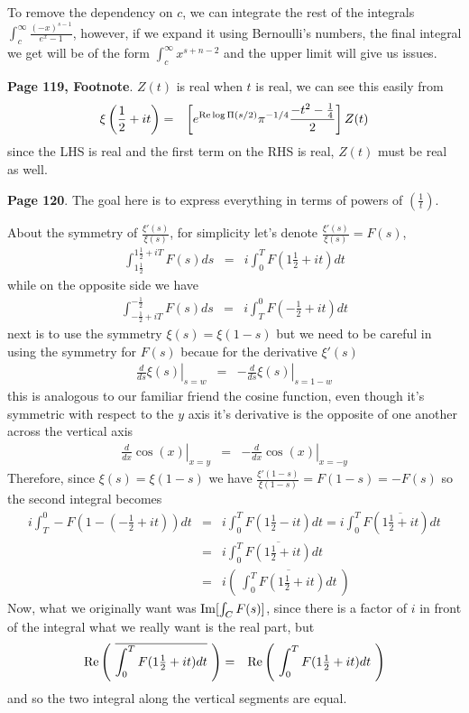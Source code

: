 \documentclass[aps,preprint,preprintnumbers,nofootinbib,showpacs,prd]{revtex4-1}
\newcommand{\nbea}{\begin{eqnarray*}}
\newcommand{\neea}{\end{eqnarray*}}
\def\Im{{\rm Im}}
\newcommand{\re}{{\rm Re}}
\begin{document}
To remove the dependency on $c$, we can integrate the rest of the integrals $\int_c^\infty \frac{(-x)^{s-1}}{e^x - 1}$, however, if we expand it using Bernoulli's numbers, the final integral we get will be of the form $\int_c^\infty x^{s + n -2}$ and the upper limit will give us issues.

{\bf Page 119, Footnote}. $Z(t)$ is real when $t$ is real, we can see this easily from 
%
\nbea
\xi\left(\frac{1}{2} + it\right) & = & \left \lbrack e^{\re \log \Pi(s/2)} \pi^{-1/4} \frac{-t^2 - \frac{1}{4}}{2} \right \rbrack Z(t)
\neea
%
since the LHS is real and the first term on the RHS is real, $Z(t)$ must be real as well.

{\bf Page 120}. The goal here is to express everything in terms of powers of $\left(\frac{1}{t}\right)$.










About the symmetry of $\frac{\xi'(s)}{\xi(s)}$, for simplicity let's denote $\frac{\xi'(s)}{\xi(s)} = F(s)$,
%
\nbea
\int_{1\tfrac{1}{2}}^{1\tfrac{1}{2} + iT} F(s) ds & = & i \int_{0}^{T} F(1\tfrac{1}{2} + it) dt
\neea
%
while on the opposite side we have
%
\nbea
\int_{-\frac{1}{2} + iT}^{-\frac{1}{2}} F(s) ds & = & i \int_{T}^{0} F(-\tfrac{1}{2} + it) dt
\neea
%
next is to use the symmetry $\xi(s) = \xi(1-s)$ but we need to be careful in using the symmetry for $F(s)$ becaue for the derivative $\xi'(s)$
%
\nbea
\left. \frac{d}{ds} \xi(s) \right|_{s = w} & = & -\left. \frac{d}{ds} \xi(s) \right|_{s = 1 - w}
\neea
%
this is analogous to our familiar friend the cosine function, even though it's symmetric with respect to the $y$ axis it's derivative is the opposite of one another across the vertical axis
%
\nbea
\left. \frac{d}{dx}\cos(x) \right|_{x = y} & = & -\left. \frac{d}{dx}\cos(x) \right|_{x = -y}
\neea
%
Therefore, since $\xi(s) = \xi(1-s)$ we have $\frac{\xi'(1-s)}{\xi(1-s)} = F(1-s) = -F(s)$ so the second integral becomes
%
\nbea
i \int_{T}^{0} -F(1 - (-\tfrac{1}{2} + it)) dt & = & i \int_{0}^{T} F(1\tfrac{1}{2} - it) dt = i \int_{0}^{T} F(\overline{1\tfrac{1}{2} + it}) dt \\
& = & i \int_{0}^{T} \overline{F(1\tfrac{1}{2} + it)} dt \\
& = & i \left  ( ~\overline{\int_{0}^{T} F(1\tfrac{1}{2} + it) dt } ~ \right )
\neea
%
Now, what we originally want was $\Im[\int_C F(s)]$, since there is a factor of $i$ in front of the integral what we really want is the real part, but
%
\nbea
\re\left  ( ~\overline{\int_{0}^{T} F(1\tfrac{1}{2} + it) dt } ~ \right ) & = & \re \left  ( ~\int_{0}^{T} F(1\tfrac{1}{2} + it) dt ~ \right )
\neea
%
and so the two integral along the vertical segments are equal.
\end{document}
